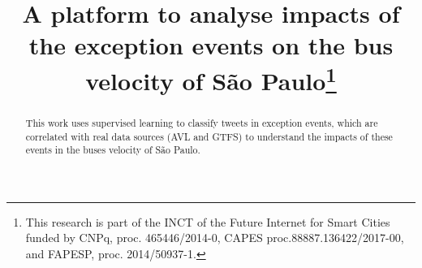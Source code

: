 \documentclass[runningheads]{llncs}
\begin{document}
%
\title{A platform to analyse impacts of the exception events on the bus velocity of São Paulo\thanks{This research is part of the INCT of the Future Internet for Smart Cities funded by CNPq, proc. 465446/2014-0, CAPES proc.88887.136422/2017-00, and FAPESP, proc. 2014/50937-1.}}
%
%

%
%
%
\maketitle              %
%
\begin{abstract}

This work uses supervised learning to classify tweets in exception events, which are correlated with real data sources (AVL and GTFS) to understand the impacts of these events in the buses velocity of São Paulo.


\end{abstract}
%
%
%
%
%
\end{document}
